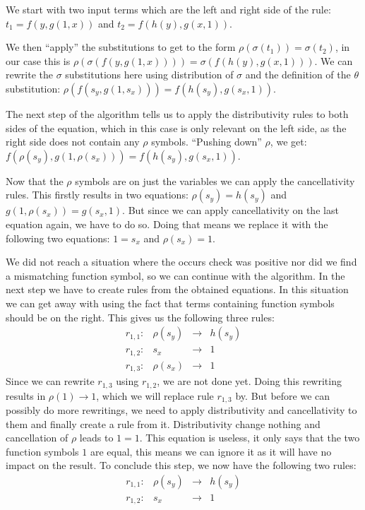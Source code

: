 We start with two input terms which are the left and right side of the rule: $t_1 = f(y, g(1, x))$ and $t_2 = f(h(y), g(x, 1))$.

We then ``apply'' the substitutions to get to the form $\rho(\sigma(t_1)) = \sigma(t_2)$, in our case this is $\rho(\sigma(f(y, g(1, x)))) = \sigma(f(h(y), g(x, 1)))$. We can rewrite the $\sigma$ substitutions here using distribution of $\sigma$ and the definition of the $\theta$ substitution: $\rho(f(s_y, g(1, s_x))) = f(h(s_y), g(s_x, 1))$.

The next step of the algorithm tells us to apply the distributivity rules to both sides of the equation, which in this case is only relevant on the left side, as the right side does not contain any $\rho$ symbols. ``Pushing down'' $\rho$, we get: $f(\rho(s_y), g(1, \rho(s_x))) = f(h(s_y), g(s_x, 1))$.

Now that the $\rho$ symbols are on just the variables we can apply the cancellativity rules. This firstly results in two equations: $\rho(s_y) = h(s_y)$ and $g(1, \rho(s_x)) = g(s_x, 1)$. But since we can apply cancellativity on the last equation again, we have to do so. Doing that means we replace it with the following two equations: $1 = s_x$ and $\rho(s_x) = 1$.

We did not reach a situation where the occurs check was positive nor did we find a mismatching function symbol, so we can continue with the algorithm. In the next step we have to create rules from the obtained equations. In this situation we can get away with using the fact that terms containing function symbols should be on the right. This gives us the following three rules:
$$
\begin{array}{lrcl}
    r_{1,1}: & \rho(s_y) & \rightarrow & h(s_y) \\
    r_{1,2}: & s_x & \rightarrow & 1 \\
    r_{1,3}: & \rho(s_x) & \rightarrow & 1
\end{array}
$$
Since we can rewrite $r_{1,3}$ using $r_{1,2}$, we are not done yet. Doing this rewriting results in $\rho(1) \rightarrow 1$, which we will replace rule $r_{1,3}$ by. But before we can possibly do more rewritings, we need to apply distributivity and cancellativity to them and finally create a rule from it. Distributivity change nothing and cancellation of $\rho$ leads to $1 = 1$. This equation is useless, it only says that the two function symbols $1$ are equal, this means we can ignore it as it will have no impact on the result. To conclude this step, we now have the following two rules:
$$
\begin{array}{lrcl}
    r_{1,1}: & \rho(s_y) & \rightarrow & h(s_y) \\
    r_{1,2}: & s_x & \rightarrow & 1
\end{array}
$$

